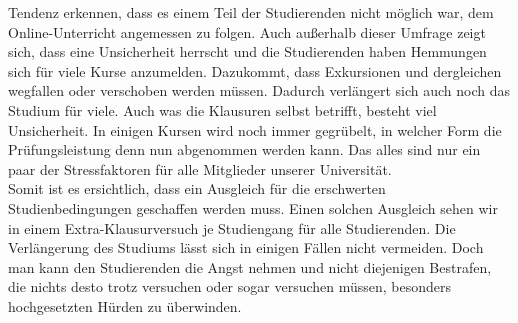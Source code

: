             Tendenz erkennen, dass es einem Teil der Studierenden nicht möglich war, dem Online-Unterricht
            angemessen zu folgen. Auch außerhalb dieser Umfrage zeigt sich, dass eine Unsicherheit herrscht
            und die Studierenden haben Hemmungen sich für viele Kurse anzumelden. Dazukommt, dass
            Exkursionen und dergleichen wegfallen oder verschoben werden müssen. Dadurch verlängert sich
            auch noch das Studium für viele. Auch was die Klausuren selbst betrifft, besteht viel Unsicherheit.
            In einigen Kursen wird noch immer gegrübelt, in welcher Form die Prüfungsleistung denn nun
            abgenommen werden kann. Das alles sind nur ein paar der Stressfaktoren für alle Mitglieder unserer
            Universität.\\
            Somit ist es ersichtlich, dass ein Ausgleich für die erschwerten Studienbedingungen geschaffen
            werden muss. Einen solchen Ausgleich sehen wir in einem Extra-Klausurversuch je Studiengang für
            alle Studierenden. Die Verlängerung des Studiums lässt sich in einigen Fällen nicht vermeiden.
            Doch man kann den Studierenden die Angst nehmen und nicht diejenigen Bestrafen, die nichts
            desto trotz versuchen oder sogar versuchen müssen, besonders hochgesetzten Hürden zu
            überwinden.
        \ul{}
        
